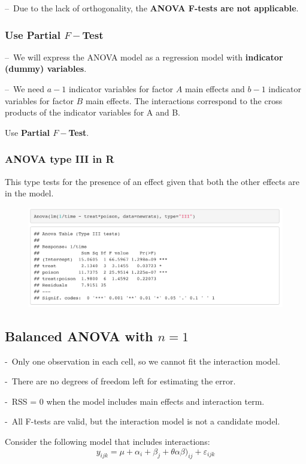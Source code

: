\documentclass[11pt,a4paper]{article}
\begin{document}
–\ Due to the lack of orthogonality, the \textbf{ANOVA F-tests are not applicable}.

\subsubsection{ Use \textbf{Partial $F-$Test}}
–\ We will express the ANOVA model as a regression model with \textbf{indicator (dummy) variables}.

–\ We need $a − 1$ indicator variables for factor $A$ main effects and $b − 1$ indicator variables for factor $B$ main effects. The interactions correspond to the cross products of the indicator variables for A and B.

Use \textbf{Partial $F-$Test}.

\subsubsection{ANOVA type III in R}
This type tests for the presence of an eﬀect given that both the other eﬀects are in the model.
\begin{center}\begin{figure}[htbp]
    \centering
    \includegraphics[scale=0.3]{type3}
    \caption{}
    \label{}
\end{figure}\end{center}

\subsection{ Balanced ANOVA with $n = 1$}
-\ Only one observation in each cell, so we cannot ﬁt the interaction model.

-\ There are no degrees of freedom left for estimating the error.

-\ RSS = 0 when the model includes main eﬀects and interaction term.

-\ All F-tests are valid, but the interaction model is not a candidate model.

Consider the following model that includes interactions:
$$y_{ijk}=\mu+\alpha_i+\beta_j+\theta\alpha\beta)_{ij}+\varepsilon_{ijk}$$
\end{document}
